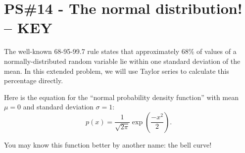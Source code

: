 


%


\allowdisplaybreaks
\section{PS\#14 - The normal distribution! -- {\color{red} KEY} }

\everymath{\displaystyle}
The well-known 68-95-99.7 rule states that approximately 68\% of values of a normally-distributed random variable lie within one standard deviation of the mean. In this extended problem, we will use Taylor series to calculate this percentage directly.

Here is the equation for the ``normal probability density function'' with mean $\mu=0$ and standard deviation $\sigma=1$: \[p(x) = \frac{1}{\sqrt{2\pi}} \exp\left(\frac{-x^2}{2}\right).\]

You may know this function better by another name: the bell curve!


